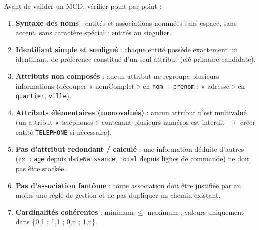 \documentclass[11pt]{article}
\begin{document}
\begin{methode}
Avant de valider un MCD, vérifier point par point :
\begin{enumerate}
\item \textbf{Syntaxe des noms} : entités et associations nommées sans espace, sans accent, sans caractère spécial ; entités au singulier.
\item \textbf{Identifiant simple et souligné} : chaque entité possède exactement un identifiant, de préférence constitué d'un seul attribut (clé primaire candidate).
\item \textbf{Attributs non composés} : aucun attribut ne regroupe plusieurs informations (découper « nomComplet » en \texttt{nom} + \texttt{prenom} ; « adresse » en \texttt{quartier}, \texttt{ville}).
\item \textbf{Attributs élémentaires (monovalués)} : aucun attribut n'est multivalué (un attribut « telephones » contenant plusieurs numéros est interdit $\to$ créer entité \texttt{TELEPHONE} si nécessaire).
\item \textbf{Pas d'attribut redondant / calculé} : une information déduite d'autres (ex. : \texttt{age} depuis \texttt{dateNaissance}, \texttt{total} depuis lignes de commande) ne doit pas être stockée.
\item \textbf{Pas d'association fantôme} : toute association doit être justifiée par au moins une règle de gestion et ne pas dupliquer un chemin existant.
\item \textbf{Cardinalités cohérentes} : minimum $\le$ maximum ; valeurs uniquement dans \{0,1 ; 1,1 ; 0,n ; 1,n\}.
\end{enumerate}
\end{methode}
\end{document}
